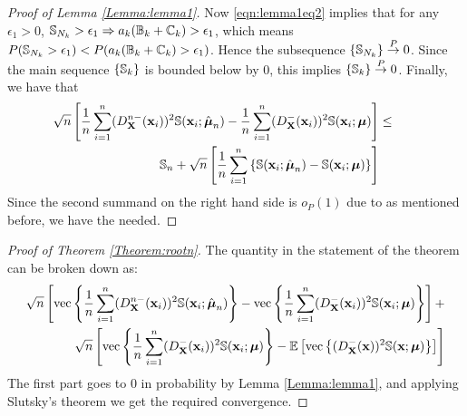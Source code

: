 \begin{proof}[Proof of Lemma \ref{Lemma:lemma1}]
Now \eqref{eqn:lemma1eq2} implies that for any $\epsilon_1 > 0$, ${\mathbb{S}}_{N_k} > \epsilon_1 \Rightarrow a_k ({\mathbb{B}}_k + {\mathbb{C}}_k) > \epsilon_1$, which means $ P({\mathbb{S}}_{N_k} > \epsilon_1) < P(a_k ({\mathbb{B}}_k + {\mathbb{C}}_k) > \epsilon_1)$. Hence the subsequence $\{{\mathbb{S}}_{N_k}\} \stackrel{P}{\rightarrow} 0$. Since the main sequence $\{{\mathbb{S}}_k\}$ is bounded below by 0, this implies $\{{\mathbb{S}}_k\} \stackrel{P}{\rightarrow} 0$. Finally, we have that
%
\begin{eqnarray}
\sqrt n \left[
\frac{1}{n} \sum_{i=1}^n ( D^{n-}_{\mathbf{X}} ({\bf{x}}_i))^2 {\mathbb{S}}({\bf{x}}_i; \hat{{\boldsymbol{\mu}}}_n) -
\frac{1}{n} \sum_{i=1}^n (D^-_{\mathbf{X}} ({\bf{x}}_i))^2 {\mathbb{S}}({\bf{x}}_i; {\boldsymbol{\mu}}) \right] &\leq & \hspace{1em} \notag\\
{\mathbb{S}}_n +  \sqrt{n} \left[ \frac{1}{n} \sum_{i=1}^{n} \left\{ {\mathbb{S}}({\bf{x}}_i; \hat{{\boldsymbol{\mu}}}_{n}) - {\mathbb{S}}({\bf{x}}_i; {\boldsymbol{\mu}}) \right\} \right] &&
\end{eqnarray}
%
Since the second summand on the right hand side is $o_P(1)$ due to \cite{durre14} as mentioned before, we have the needed.
\end{proof}

\begin{proof}[Proof of Theorem \ref{Theorem:rootn}]
The quantity in the statement of the theorem can be broken down as:
%
\begin{eqnarray*}
\sqrt n \left[ \operatorname*{vec} \left\{ \frac{1}{n} \sum_{i=1}^n ( D^{n-}_{\mathbf{X}} ({\bf{x}}_i))^2 {\mathbb{S}}({\bf{x}}_i; \hat{{\boldsymbol{\mu}}}_n) \right\} - \operatorname*{vec} \left\{ \frac{1}{n} \sum_{i=1}^n (D^-_{\mathbf{X}} ({\bf{x}}_i))^2 {\mathbb{S}}( {\bf{x}}_i; {\boldsymbol{\mu}}) \right\} \right] +\\
\sqrt n \left[ \operatorname*{vec} \left\{ \frac{1}{n} \sum_{i=1}^n (D^-_{\mathbf{X}} ({\bf{x}}_i))^2 {\mathbb{S}}( {\bf{x}}_i; {\boldsymbol{\mu}}) \right\} - {\mathbb{E}} \left[ \operatorname*{vec} \left\{ (D^-_{\mathbf{X}} ({\bf{x}}))^2 {\mathbb{S}}( {\bf{x}}; {\boldsymbol{\mu}}) \right\} \right] \right]
\end{eqnarray*}
%
The first part goes to 0 in probability by Lemma \ref{Lemma:lemma1}, and applying Slutsky's theorem we get the required convergence.
\end{proof}

